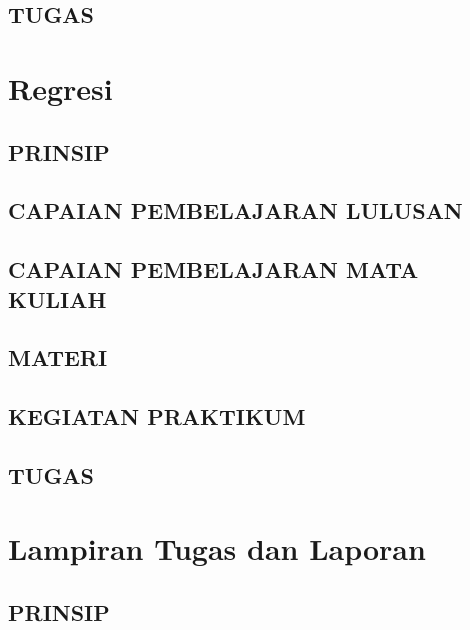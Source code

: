 \documentclass[
]{book}
\begin{document}
\hypertarget{tugas-2}{%
\section{TUGAS}\label{tugas-2}}

\hypertarget{regresi}{%
\chapter{Regresi}\label{regresi}}

\hypertarget{prinsip-3}{%
\section{PRINSIP}\label{prinsip-3}}

\hypertarget{capaian-pembelajaran-lulusan-3}{%
\section{CAPAIAN PEMBELAJARAN LULUSAN}\label{capaian-pembelajaran-lulusan-3}}

\hypertarget{capaian-pembelajaran-mata-kuliah-3}{%
\section{CAPAIAN PEMBELAJARAN MATA KULIAH}\label{capaian-pembelajaran-mata-kuliah-3}}

\hypertarget{materi-2}{%
\section{MATERI}\label{materi-2}}

\hypertarget{kegiatan-praktikum-3}{%
\section{KEGIATAN PRAKTIKUM}\label{kegiatan-praktikum-3}}

\hypertarget{tugas-3}{%
\section{TUGAS}\label{tugas-3}}

\hypertarget{lampiran-tugas-dan-laporan}{%
\chapter{Lampiran Tugas dan Laporan}\label{lampiran-tugas-dan-laporan}}

\hypertarget{prinsip-4}{%
\section{PRINSIP}\label{prinsip-4}}
\end{document}
